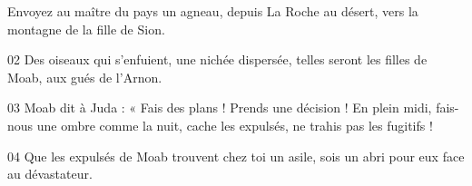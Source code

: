 Envoyez au maître du pays un agneau, depuis La Roche au désert, vers la montagne de la fille de Sion.

02 Des oiseaux qui s’enfuient, une nichée dispersée, telles seront les filles de Moab, aux gués de l’Arnon.

03 Moab dit à Juda : « Fais des plans ! Prends une décision ! En plein midi, fais-nous une ombre comme la nuit, cache les expulsés, ne trahis pas les fugitifs !

04 Que les expulsés de Moab trouvent chez toi un asile, sois un abri pour eux face au dévastateur. 